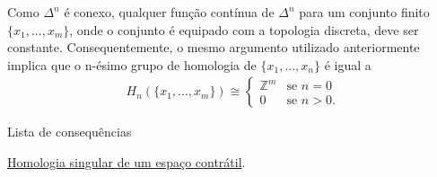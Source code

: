 Como $\Delta^n$ é conexo, qualquer função contínua de $\Delta^n$ para um conjunto finito $\{x_1,...,x_m\}$, onde o conjunto é equipado com a topologia discreta, deve ser constante. Consequentemente, o mesmo argumento utilizado anteriormente implica que o n-ésimo grupo de homologia de $\{x_1,...,x_n\}$ é igual a
\begin{align*}
        H_n(\{x_1,...,x_m\})\cong\begin{cases}
            \mathbb{Z}^m&\text{se }n=0\\
            0&\text{se }n>0.
        \end{cases}
    \end{align*}
\begin{titlemize}{Lista de consequências}
    \item \hyperref[homologia-singular-de-um-espaco-contratil-prop]{Homologia singular de um espaço contrátil}.
\end{titlemize}
